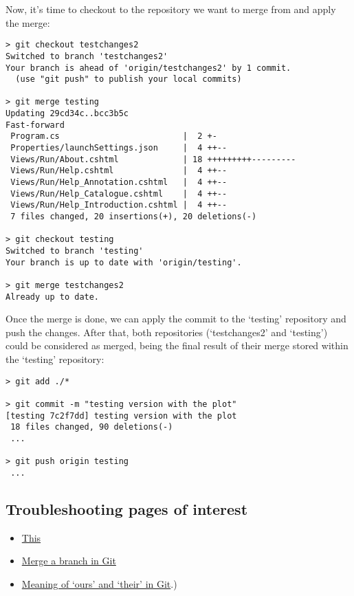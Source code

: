 \documentclass[]{book}
\providecommand{\tightlist}{%
  \setlength{\itemsep}{0pt}\setlength{\parskip}{0pt}}
\begin{document}
Now, it's time to checkout to the repository we want to merge from and
apply the merge:

\begin{verbatim}
> git checkout testchanges2
Switched to branch 'testchanges2'
Your branch is ahead of 'origin/testchanges2' by 1 commit.
  (use "git push" to publish your local commits)

> git merge testing
Updating 29cd34c..bcc3b5c
Fast-forward
 Program.cs                         |  2 +-
 Properties/launchSettings.json     |  4 ++--
 Views/Run/About.cshtml             | 18 +++++++++---------
 Views/Run/Help.cshtml              |  4 ++--
 Views/Run/Help_Annotation.cshtml   |  4 ++--
 Views/Run/Help_Catalogue.cshtml    |  4 ++--
 Views/Run/Help_Introduction.cshtml |  4 ++--
 7 files changed, 20 insertions(+), 20 deletions(-)

> git checkout testing
Switched to branch 'testing'
Your branch is up to date with 'origin/testing'.

> git merge testchanges2
Already up to date.
\end{verbatim}

Once the merge is done, we can apply the commit to the `testing'
repository and push the changes. After that, both repositories
(`testchanges2' and `testing') could be considered as merged, being the
final result of their merge stored within the `testing' repository:

\begin{verbatim}
> git add ./*

> git commit -m "testing version with the plot"
[testing 7c2f7dd] testing version with the plot
 18 files changed, 90 deletions(-)
 ...

> git push origin testing
 ...
\end{verbatim}

\subsection{Troubleshooting pages of
interest}\label{troubleshooting-pages-of-interest}

\begin{itemize}
\tightlist
\item
  \href{https://stackoverflow.com/questions/13885390/in-git-merge-conflicts-how-do-i-keep-the-version-that-is-being-merged-in}{This}
\item
  \href{https://www.toolsqa.com/git/merge-branch-in-git/}{Merge a branch
  in Git}
\item
  \href{https://stackoverflow.com/questions/25576415/what-is-the-precise-meaning-of-ours-and-theirs-in-git\#:~:text=The\%20'ours'\%20in\%20Git\%20is,replayed\%20onto\%20the\%20current\%20branch}{Meaning
  of `ours' and `their' in Git}.)
\end{itemize}
\end{document}

